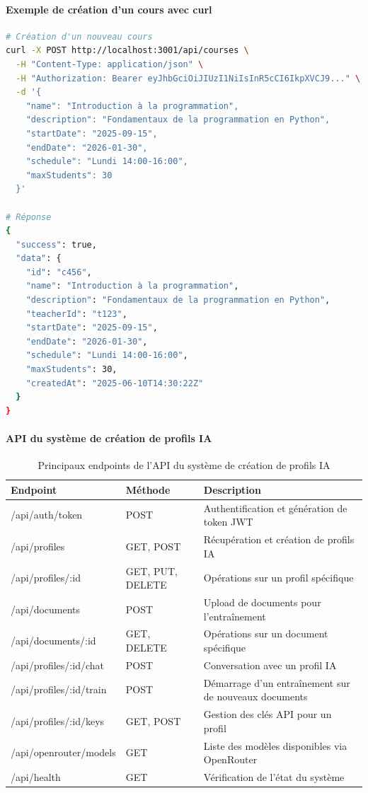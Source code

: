 \paragraph{Exemple de création d'un cours avec curl}

\begin{lstlisting}[style=codestyle, language=bash]
# Création d'un nouveau cours
curl -X POST http://localhost:3001/api/courses \
  -H "Content-Type: application/json" \
  -H "Authorization: Bearer eyJhbGciOiJIUzI1NiIsInR5cCI6IkpXVCJ9..." \
  -d '{
    "name": "Introduction à la programmation",
    "description": "Fondamentaux de la programmation en Python",
    "startDate": "2025-09-15",
    "endDate": "2026-01-30",
    "schedule": "Lundi 14:00-16:00",
    "maxStudents": 30
  }'

# Réponse
{
  "success": true,
  "data": {
    "id": "c456",
    "name": "Introduction à la programmation",
    "description": "Fondamentaux de la programmation en Python",
    "teacherId": "t123",
    "startDate": "2025-09-15",
    "endDate": "2026-01-30",
    "schedule": "Lundi 14:00-16:00",
    "maxStudents": 30,
    "createdAt": "2025-06-10T14:30:22Z"
  }
}
\end{lstlisting}

\paragraph{API du système de création de profils IA}

\begin{table}[H]
\centering
\renewcommand{\arraystretch}{1.2}
\begin{tabular}{|p{3.8cm}|p{2cm}|p{8.2cm}|}
\hline
\textbf{Endpoint} & \textbf{Méthode} & \textbf{Description} \\
\hline
/api/auth/token & POST & Authentification et génération de token JWT \\
\hline
/api/profiles & GET, POST & Récupération et création de profils IA \\
\hline
/api/profiles/:id & GET, PUT, DELETE & Opérations sur un profil spécifique \\
\hline
/api/documents & POST & Upload de documents pour l'entraînement \\
\hline
/api/documents/:id & GET, DELETE & Opérations sur un document spécifique \\
\hline
/api/profiles/:id/chat & POST & Conversation avec un profil IA \\
\hline
/api/profiles/:id/train & POST & Démarrage d'un entraînement sur de nouveaux documents \\
\hline
/api/profiles/:id/keys & GET, POST & Gestion des clés API pour un profil \\
\hline
/api/openrouter/models & GET & Liste des modèles disponibles via OpenRouter \\
\hline
/api/health & GET & Vérification de l'état du système \\
\hline
\end{tabular}
\caption{Principaux endpoints de l'API du système de création de profils IA}
\label{tab:ai_api_endpoints}
\end{table}


